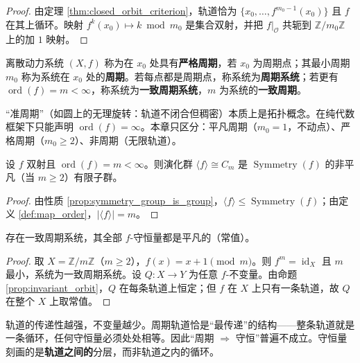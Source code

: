\begin{proof}
由定理 \ref{thm:closed_orbit_criterion}，轨道恰为 $\{x_0,\dots,f^{m_0-1}(x_0)\}$ 且 $f$ 在其上循环。映射 $f^k(x_0)\mapsto k\bmod m_0$ 是集合双射，并把 $f|_{\mathcal{O}}$ 共轭到 $\mathbb{Z}/m_0\mathbb{Z}$ 上的加 $1$ 映射。
\end{proof}

\begin{definition}[严格周期]\label{def:strict_period}
离散动力系统 $(X,f)$ 称为在 $x_0$ 处具有\textbf{严格周期}，若 $x_0$ 为周期点；其最小周期 $m_0$ 称为系统在 $x_0$ 处的\textbf{周期}。若每点都是周期点，称系统为\textbf{周期系统}；若更有 $\operatorname{ord}(f)=m<\infty$，称系统为\textbf{一致周期系统}，$m$ 为系统的\textbf{一致周期}。
\end{definition}

\begin{remark}[准周期的位置]\label{rem:quasi_period}
“准周期”（如圆上的无理旋转：轨道不闭合但稠密）本质上是拓扑概念。在纯代数框架下只能声明 $\operatorname{ord}(f)=\infty$。本章只区分：平凡周期（$m_0=1$，不动点）、严格周期（$m_0\ge 2$）、非周期（无限轨道）。
\end{remark}

\begin{proposition}[周期产生对称]\label{prop:period_implies_symmetry}
设 $f$ 双射且 $\operatorname{ord}(f)=m<\infty$。则演化群 $\langle f\rangle\cong C_m$ 是 $\operatorname{Symmetry}(f)$ 的非平凡（当 $m\ge 2$）有限子群。
\end{proposition}

\begin{proof}
由性质 \ref{prop:symmetry_group_is_group}，$\langle f\rangle\le\operatorname{Symmetry}(f)$；由定义 \ref{def:map_order}，$|\langle f\rangle|=m$。
\end{proof}

\begin{theorem}[周期不蕴含非平凡守恒]\label{thm:period_not_imply_conservation}
存在一致周期系统，其全部 $f$-守恒量都是平凡的（常值）。
\end{theorem}

\begin{proof}
取 $X=\mathbb{Z}/m\mathbb{Z}$（$m\ge 2$），$f(x)=x+1\pmod m$。则 $f^m=\operatorname{id}_X$ 且 $m$ 最小，系统为一致周期系统。设 $Q:X\to Y$ 为任意 $f$-不变量。由命题 \ref{prop:invariant_orbit}，$Q$ 在每条轨道上恒定；但 $f$ 在 $X$ 上只有一条轨道，故 $Q$ 在整个 $X$ 上取常值。
\end{proof}

\begin{remark}[周期与守恒的层次差异]\label{rem:gap_diagnosis}
轨道的传递性越强，不变量越少。周期轨道恰是“最传递”的结构——整条轨道就是一条循环，任何守恒量必须处处相等。因此“周期 $\Rightarrow$ 守恒”普遍不成立。守恒量刻画的是\textbf{轨道之间的}分层，而非轨道之内的循环。
\end{remark}

